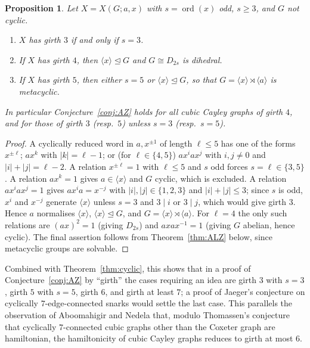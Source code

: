\documentclass[11pt,a4paper]{article}
\newtheorem{proposition}[theorem]{Proposition}
\theoremstyle{definition}
\theoremstyle{remark}
\newcommand{\ord}{\operatorname{ord}}
\newcommand{\X}[3]{X(#1;#2,#3)}
\begin{document}
\begin{proposition}\label{prop:girth}
Let $X=\X{G}{a}{x}$ with $s=\ord(x)$ odd, $s\ge3$, and $G$ not cyclic.
\begin{enumerate}[label=\textup{(\alph*)}]
\item $X$ has girth $3$ if and only if $s=3$.
\item If $X$ has girth $4$, then $\langle x\rangle\trianglelefteq G$ and $G\cong D_{2s}$ is dihedral.
\item If $X$ has girth $5$, then either $s=5$ or $\langle x\rangle\trianglelefteq G$, so that $G=\langle x\rangle\rtimes\langle a\rangle$ is metacyclic.
\end{enumerate}
In particular Conjecture~\ref{conj:AZ} holds for all cubic Cayley graphs of girth $4$, and for those of girth $3$ (resp.\ $5$) unless $s=3$ (resp.\ $s=5$).
\end{proposition}
\begin{proof}
A cyclically reduced word in $a,x^{\pm1}$ of length $\ell\le5$ has one of the forms $x^{\pm\ell}$; $ax^{k}$ with $|k|=\ell-1$; or (for $\ell\in\{4,5\}$) $ax^{i}ax^{j}$ with $i,j\ne0$ and $|i|+|j|=\ell-2$.  A relation $x^{\pm\ell}=1$ with $\ell\le5$ and $s$ odd forces $s=\ell\in\{3,5\}$.  A relation $ax^{k}=1$ gives $a\in\langle x\rangle$ and $G$ cyclic, which is excluded.  A relation $ax^{i}ax^{j}=1$ gives $ax^{i}a=x^{-j}$ with $|i|,|j|\in\{1,2,3\}$ and $|i|+|j|\le3$; since $s$ is odd, $x^{i}$ and $x^{-j}$ generate $\langle x\rangle$ unless $s=3$ and $3\mid i$ or $3\mid j$, which would give girth $3$.  Hence $a$ normalises $\langle x\rangle$, $\langle x\rangle\trianglelefteq G$, and $G=\langle x\rangle\rtimes\langle a\rangle$.  For $\ell=4$ the only such relations are $(ax)^2=1$ (giving $D_{2s}$) and $axax^{-1}=1$ (giving $G$ abelian, hence cyclic).  The final assertion follows from Theorem~\ref{thm:ALZ} below, since metacyclic groups are solvable.
\end{proof}

Combined with Theorem~\ref{thm:cyclic}, this shows that in a proof of Conjecture~\ref{conj:AZ} by ``girth'' the cases requiring an idea are girth $3$ with $s=3$, girth $5$ with $s=5$, girth $6$, and girth at least $7$; a proof of Jaeger's conjecture on cyclically $7$-edge-connected snarks would settle the last case.  This parallels the observation of Aboomahigir and Nedela \cite{AboomahigirNedela19} that, modulo Thomassen's conjecture that cyclically $7$-connected cubic graphs other than the Coxeter graph are hamiltonian, the hamiltonicity of cubic Cayley graphs reduces to girth at most $6$.
\end{document}
